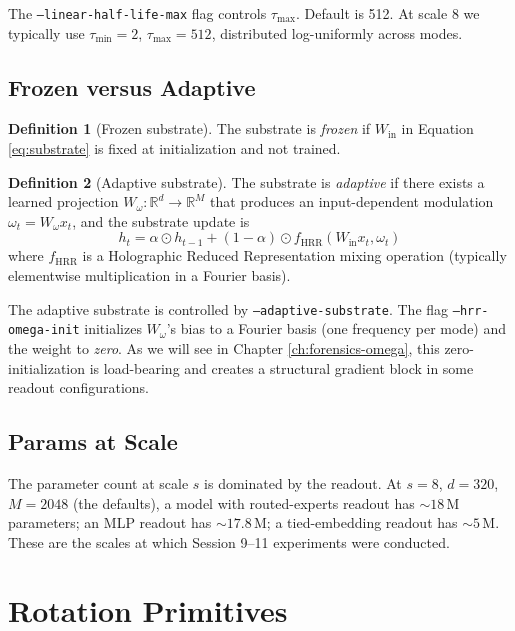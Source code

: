 \documentclass[11pt,openany]{book}
\theoremstyle{definition}
\newtheorem{definition}{Definition}[chapter]
\theoremstyle{plain}
\newcommand{\omegaproj}{W_\omega}
\begin{document}
The \texttt{--linear-half-life-max} flag controls $\tau_{\max}$. Default
is 512. At scale 8 we typically use $\tau_{\min} = 2$, $\tau_{\max} =
512$, distributed log-uniformly across modes.

\section{Frozen versus Adaptive}

\begin{definition}[Frozen substrate]
The substrate is \emph{frozen} if $W_{\text{in}}$ in Equation
\ref{eq:substrate} is fixed at initialization and not trained.
\end{definition}

\begin{definition}[Adaptive substrate]
The substrate is \emph{adaptive} if there exists a learned projection
$\omegaproj: \mathbb{R}^d \to \mathbb{R}^M$ that produces an input-dependent
modulation $\omega_t = \omegaproj x_t$, and the substrate update is
\begin{equation}
  h_t = \alpha \odot h_{t-1} + (1 - \alpha) \odot f_{\text{HRR}}(W_{\text{in}} x_t, \omega_t)
\end{equation}
where $f_{\text{HRR}}$ is a Holographic Reduced Representation mixing
operation (typically elementwise multiplication in a Fourier basis).
\end{definition}

The adaptive substrate is controlled by \texttt{--adaptive-substrate}.
The flag \texttt{--hrr-omega-init} initializes $\omegaproj$'s bias to a
Fourier basis (one frequency per mode) and the weight to \emph{zero}.
As we will see in Chapter \ref{ch:forensics-omega}, this zero-initialization
is load-bearing and creates a structural gradient block in some readout
configurations.

\section{Params at Scale}

The parameter count at scale $s$ is dominated by the readout. At $s=8$,
$d=320$, $M=2048$ (the defaults), a model with routed-experts readout
has $\sim 18$\,M parameters; an MLP readout has $\sim 17.8$\,M; a
tied-embedding readout has $\sim 5$\,M. These are the scales at which
Session 9--11 experiments were conducted.

\chapter{Rotation Primitives}
\label{ch:rotations}
\end{document}
